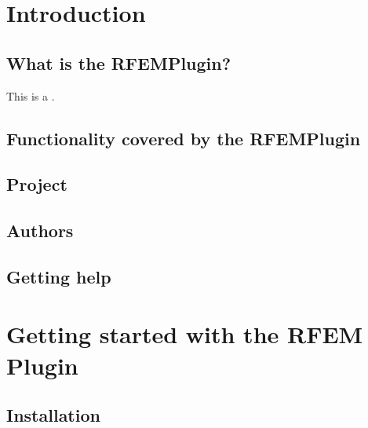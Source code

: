 \documentclass[letterpaper,10pt,english]{jupyterBook}
\begin{document}
\sphinxstepscope


\chapter{Introduction}
\label{\detokenize{Introduction:introduction}}\label{\detokenize{Introduction:id1}}\label{\detokenize{Introduction::doc}}

\section{What is the RFEM\sphinxhyphen{}Plugin?}
\label{\detokenize{Introduction:what-is-the-rfem-plugin}}
\sphinxAtStartPar
This is a {\hyperref[\detokenize{intro:intro}]{}}.


\section{Functionality covered by the RFEM\sphinxhyphen{}Plugin}
\label{\detokenize{Introduction:functionality-covered-by-the-rfem-plugin}}

\section{Project}
\label{\detokenize{Introduction:project}}

\section{Authors}
\label{\detokenize{Introduction:authors}}

\section{Getting help}
\label{\detokenize{Introduction:getting-help}}
\sphinxstepscope


\chapter{Getting started with the RFEM Plugin}
\label{\detokenize{Getting_started_with_the_RFem_Plugin:getting-started-with-the-rfem-plugin}}\label{\detokenize{Getting_started_with_the_RFem_Plugin:id1}}\label{\detokenize{Getting_started_with_the_RFem_Plugin::doc}}

\section{Installation}
\label{\detokenize{Getting_started_with_the_RFem_Plugin:installation}}
\sphinxstepscope
\end{document}
